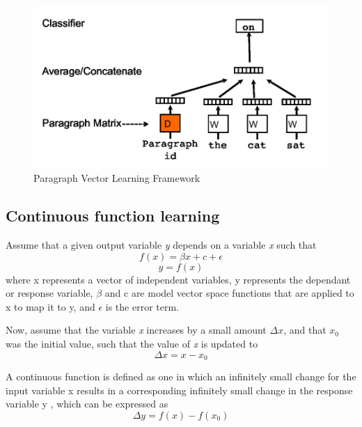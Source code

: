 \documentclass[conference]{IEEEtran}
\begin{document}
\begin{figure}[ht]
\centering
\includegraphics[width=400pt]{images/docvec_1.png}
\caption{Paragraph Vector Learning Framework\cite{mikolov2013distributed}}
\label{fig:paragraph-vector-framework}
\end{figure}


\subsection{Continuous function learning}
Assume that a given output variable \textit{y} depends on a variable \textit{x} such that
\begin{equation}
\displaystyle f(x) = \beta x + c + \epsilon
\end{equation}
\begin{equation}
\displaystyle y = f(x)
\end{equation}
where x represents a vector of independent variables, y represents the dependant or response variable, $\beta$ and c are model vector space functions that are applied to x to map it to y, and $\epsilon$ is the error term.

Now, assume that the variable \textit{x} increases by a small amount $\Delta x$, and that $x_0$ was the initial value, such that the value of \textit{x} is updated to
\begin{equation}
\displaystyle \Delta x = x - x_0
\end{equation}

A continuous function is defined as one in which an infinitely small change for the input variable x results in a corresponding infinitely small change in the response variable y \cite{continuous_function}, which can be expressed as
\begin{equation}
\displaystyle \Delta y = f(x) - f(x_0)
\end{equation}
\end{document}
